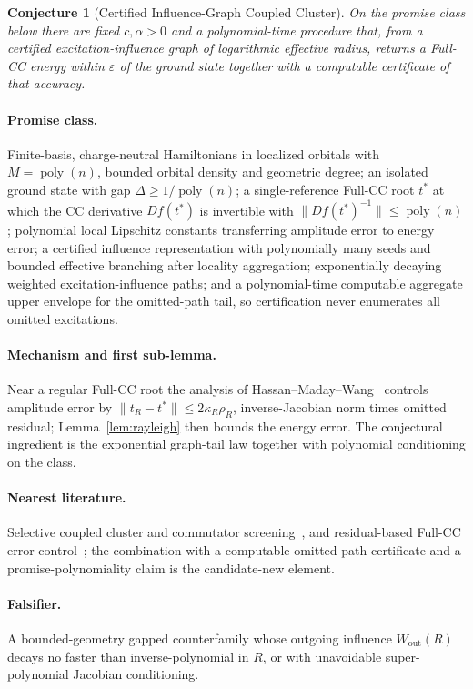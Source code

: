 \documentclass[11pt]{article}
\newtheorem{conjecture}{Conjecture}
\theoremstyle{definition}
\newcommand{\eps}{\varepsilon}
\newcommand{\poly}{\operatorname{poly}}
\begin{document}
\begin{conjecture}[Certified Influence-Graph Coupled Cluster]\label{p1}
On the promise class below there are fixed $c,\alpha>0$ and a polynomial-time
procedure that, from a certified excitation-influence graph of logarithmic
effective radius, returns a Full-CC energy within $\eps$ of the ground state
together with a computable certificate of that accuracy.
\end{conjecture}
\paragraph{Promise class.}  Finite-basis, charge-neutral Hamiltonians in
localized orbitals with $M=\poly(n)$, bounded orbital density and geometric
degree; an isolated ground state with gap $\Delta\ge1/\poly(n)$; a single-reference
Full-CC root $t^*$ at which the CC derivative $Df(t^*)$ is invertible with
$\lVert Df(t^*)^{-1}\rVert\le\poly(n)$; polynomial local Lipschitz constants
transferring amplitude error to energy error; a certified influence
representation with polynomially many seeds and bounded effective branching after
locality aggregation; exponentially decaying weighted excitation-influence paths;
and a polynomial-time computable aggregate upper envelope for the omitted-path
tail, so certification never enumerates all omitted excitations.
\paragraph{Mechanism and first sub-lemma.}  Near a regular Full-CC root the
analysis of Hassan--Maday--Wang~\cite{R5} controls amplitude error by
$\lVert t_R-t^*\rVert\le2\kappa_R\rho_R$, inverse-Jacobian norm times omitted
residual; Lemma~\ref{lem:rayleigh} then bounds the energy error.  The conjectural
ingredient is the exponential graph-tail law together with polynomial
conditioning on the class.
\paragraph{Nearest literature.}  Selective coupled cluster and commutator
screening~\cite{R6}, and residual-based Full-CC error control~\cite{R5}; the
combination with a computable omitted-path certificate and a promise-polynomiality
claim is the candidate-new element.
\paragraph{Falsifier.}  A bounded-geometry gapped counterfamily whose outgoing
influence $W_{\mathrm{out}}(R)$ decays no faster than inverse-polynomial in $R$,
or with unavoidable super-polynomial Jacobian conditioning.
\end{document}
